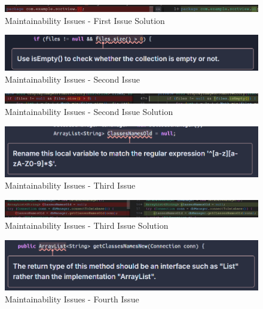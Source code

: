 \documentclass[12pt,a4paper]{article}
\begin{document}
\begin{figure}[H]
    \centering
    \includegraphics[width=1\textwidth]{Maintainability Issues-1stS.png}
    \caption{Maintainability Issues - First Issue Solution}
    \label{fig:MI-1stS}
\end{figure}
\begin{figure}[H]
    \centering
    \includegraphics[width=1\textwidth]{Maintainability Issues-2nd.png}
    \caption{Maintainability Issues - Second Issue}
    \label{fig:MI-2nd}
\end{figure}
\begin{figure}[H]
    \centering
    \includegraphics[width=1\textwidth]{Maintainability Issues-2ndS.png}
    \caption{Maintainability Issues - Second Issue Solution}
    \label{fig:MI-2ndS}
\end{figure}
\begin{figure}[H]
    \centering
    \includegraphics[width=1\textwidth]{Maintainability Issues-3rd.png}
    \caption{Maintainability Issues - Third Issue}
    \label{fig:MI-3rd}
\end{figure}
\begin{figure}[H]
    \centering
    \includegraphics[width=1\textwidth]{Maintainability Issues-3rdS.png}
    \caption{Maintainability Issues - Third Issue Solution}
    \label{fig:MI-3rdS}
\end{figure}
\begin{figure}[H]
    \centering
    \includegraphics[width=1\textwidth]{Maintainability Issues-4th.png}
    \caption{Maintainability Issues - Fourth Issue}
    \label{fig:MI-4th}
\end{figure}
\end{document}
